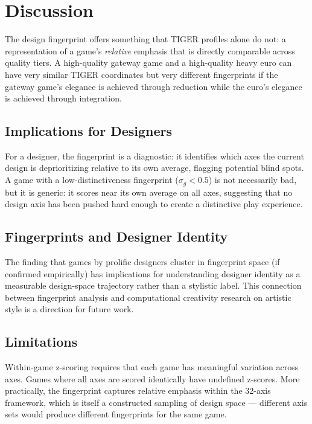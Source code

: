 \section{Discussion}
\label{sec:discussion}

The design fingerprint offers something that TIGER profiles alone do not: a representation
of a game's \emph{relative} emphasis that is directly comparable across quality tiers.
A high-quality gateway game and a high-quality heavy euro can have very similar TIGER
coordinates but very different fingerprints if the gateway game's elegance is achieved
through reduction while the euro's elegance is achieved through integration.

\subsection{Implications for Designers}

For a designer, the fingerprint is a diagnostic: it identifies which axes the current
design is deprioritizing relative to its own average, flagging potential blind spots.
A game with a low-distinctiveness fingerprint ($\sigma_g < 0.5$) is not necessarily
bad, but it is generic: it scores near its own average on all axes, suggesting that
no design axis has been pushed hard enough to create a distinctive play experience.

\subsection{Fingerprints and Designer Identity}

The finding that games by prolific designers cluster in fingerprint space (if confirmed
empirically) has implications for understanding designer identity as a measurable
design-space trajectory rather than a stylistic label. This connection between fingerprint
analysis and computational creativity research on artistic style is a direction for
future work.

\subsection{Limitations}

Within-game z-scoring requires that each game has meaningful variation across axes.
Games where all axes are scored identically have undefined z-scores. More practically,
the fingerprint captures relative emphasis within the 32-axis framework, which is itself
a constructed sampling of design space --- different axis sets would produce different
fingerprints for the same game.
